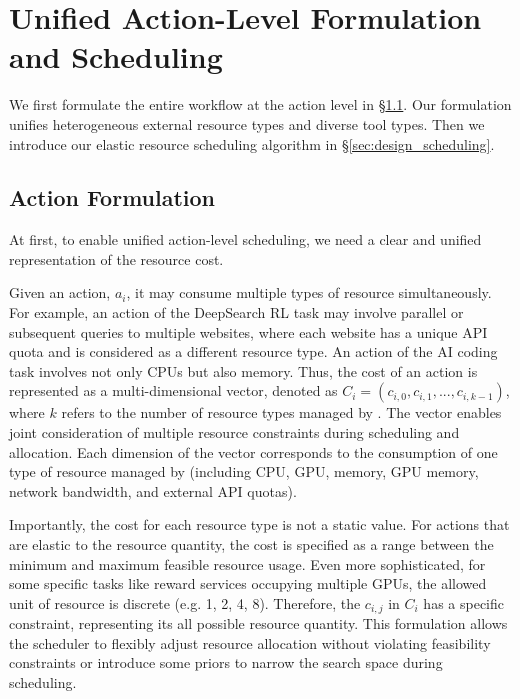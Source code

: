 \section{Unified Action-Level Formulation and Scheduling}

We first formulate the entire workflow at the action level in \S\ref{sec:design_modeling}.
Our formulation unifies heterogeneous external resource types and diverse tool types.
Then we introduce our elastic resource scheduling algorithm in \S\ref{sec:design_scheduling}.

\subsection{Action Formulation}
\label{sec:design_modeling}

At first, to enable unified action-level scheduling, we need a clear and unified representation of the resource cost.

Given an action, $a_i$, it may consume multiple types of resource simultaneously. For example, an action of the DeepSearch RL task may involve parallel or subsequent queries to multiple websites, where each website has a unique API quota and is considered as a different resource type.
An action of the AI coding task involves not only CPUs but also memory.
Thus, the cost of an action is represented as a multi-dimensional vector, denoted as $C_i = (c_{i,0}, c_{i,1},...,c_{i,k-1})$, where $k$ refers to the number of resource types managed by \sysname.
The vector enables joint consideration of multiple resource constraints during scheduling and allocation.
Each dimension of the vector corresponds to the consumption of one type of resource managed by \sysname (including CPU, GPU, memory, GPU memory, network bandwidth, and external API quotas).

Importantly, the cost for each resource type is not a static value.
For actions that are elastic to the resource quantity, the cost is specified as a range between the minimum and maximum feasible resource usage.
Even more sophisticated, for some specific tasks like reward services occupying multiple GPUs, the allowed unit of resource is discrete (e.g. 1, 2, 4, 8).
Therefore, the $c_{i,j}$ in $C_i$ has a specific constraint, representing its all possible resource quantity.
This formulation allows the scheduler to flexibly adjust resource allocation without violating feasibility constraints or introduce some priors to narrow the search space during scheduling.

